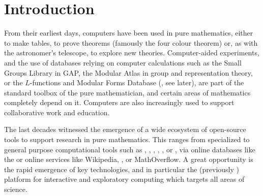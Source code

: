 \section{Introduction}

From their earliest days, computers have been used in pure mathematics, either to make
tables, to prove theorems (famously the four colour theorem) or, as with the astronomer's
telescope, to explore new theories. Computer-aided experiments, and the use of databases
relying on computer calculations such as the Small Groups Library in GAP, the Modular
Atlas in group and representation theory, or the $L$-functions and Modular Forms Database (\LMFDB, see later), are part of the standard
toolbox of the pure mathematician, and certain areas of mathematics completely depend on
it. Computers are also increasingly used to support collaborative work and education.

The last decades witnessed the emergence of a wide ecosystem of open-source tools to
support research in pure mathematics. This ranges from specialized to general purpose
computational tools such as \GAP, \PariGP, \Linbox, \MPIR, \Sage, or \Singular, via online
databases like the \LMFDB or online services like Wikipedia,
\Arxiv, or MathOverflow. A great opportunity is the rapid emergence of key technologies,
and in particular the \Jupyter (previously \IPython) platform for interactive and
exploratory computing which targets all areas of science.

